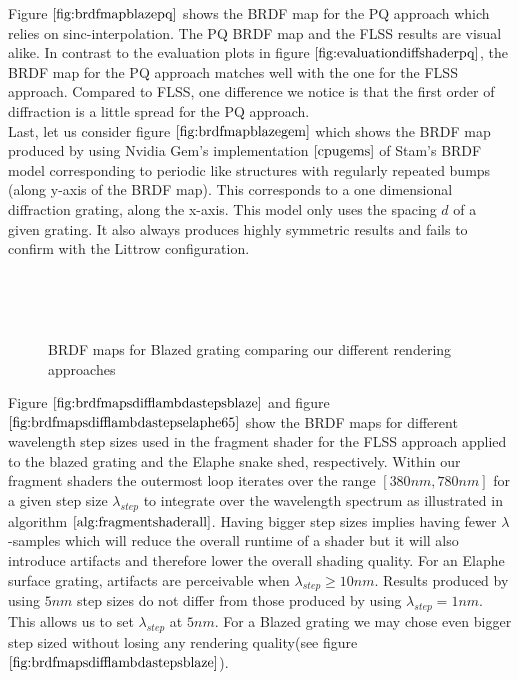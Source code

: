Figure $\ref{fig:brdfmapblazepq}$ shows the BRDF map for the PQ approach which relies on sinc-interpolation. The PQ BRDF map and the FLSS results are visual alike. In contrast to the evaluation plots in figure $\ref{fig:evaluationdiffshaderpq}$, the BRDF map for the PQ approach matches well with the one for the FLSS approach. Compared to FLSS, one difference we notice is that the first order of diffraction is a little spread for the PQ approach. \\

Last, let us consider figure $\ref{fig:brdfmapblazegem}$ which shows the BRDF map produced by using Nvidia Gem's implementation $\cite{cpugems}$ of Stam's BRDF model corresponding to periodic like structures with regularly repeated bumps (along y-axis of the BRDF map). This corresponds to a one dimensional diffraction grating, along the x-axis. This model only uses the spacing $d$ of a given grating. It also always produces highly symmetric results and fails to confirm with the Littrow configuration.   

\begin{figure}[H]
  \centering
~

~
    
\caption[BRDF Map: Our Approaches applied on a Blazed Grating]{BRDF maps for Blazed grating comparing our different rendering approaches}
\label{fig:brdfmapsdiffrenderingapproaches}
\end{figure}

Figure $\ref{fig:brdfmapsdifflambdastepsblaze}$ and figure $\ref{fig:brdfmapsdifflambdastepselaphe65}$ show the BRDF maps for different wavelength step sizes used in the fragment shader for the FLSS approach applied to the blazed grating and the Elaphe snake shed, respectively. Within our fragment shaders the outermost loop iterates over the range $[380nm, 780nm]$ for a given step size $\lambda_{step}$ to integrate over the wavelength spectrum as illustrated in algorithm $\ref{alg:fragmentshaderall}$. Having bigger step sizes implies having fewer $\lambda$-samples which will reduce the overall runtime of a shader but it will also introduce artifacts and therefore lower the overall shading quality. For an Elaphe surface grating, artifacts are perceivable when $\lambda_{step} \geq 10nm$. Results produced by using $5nm$ step sizes do not differ from those produced by using $\lambda_{step}= 1nm$. This allows us to set $\lambda_{step}$ at $5nm$. For a Blazed grating we may chose even bigger step sized without losing any rendering quality(see figure $\ref{fig:brdfmapsdifflambdastepsblaze}$).   


